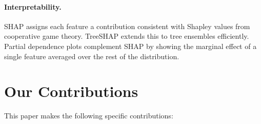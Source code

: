 \documentclass[12pt,a4paper]{article}
\begin{document}
\paragraph{Interpretability.}
SHAP \citep{lundberg2017unified} assigns each feature a contribution
consistent with Shapley values from cooperative game theory.  TreeSHAP
\citep{lundberg2020local} extends this to tree ensembles efficiently.
Partial dependence plots \citep{friedman2001greedy} complement SHAP by
showing the marginal effect of a single feature averaged over the rest of
the distribution.


\section{Our Contributions}
\label{sec:contributions}

This paper makes the following specific contributions:
\end{document}
